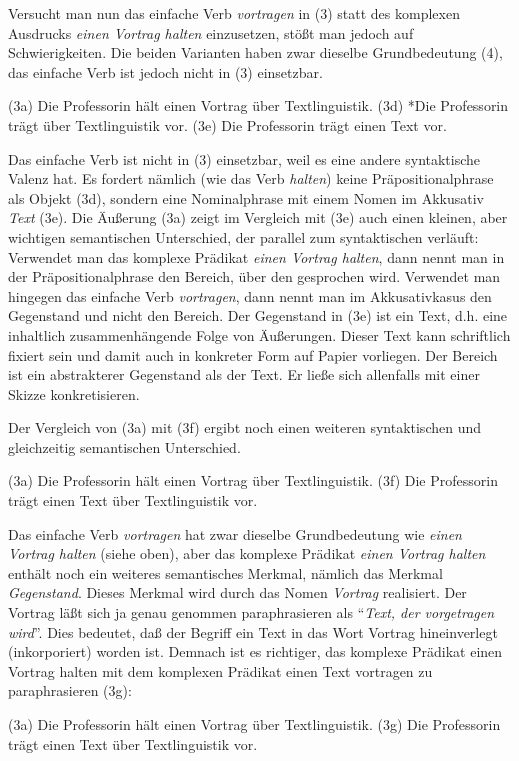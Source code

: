 \documentclass[
  letterpaper,
  DIV=11,
  numbers=noendperiod]{scrreprt}
\begin{document}
Versucht man nun das einfache Verb \emph{vortragen} in (3) statt des
komplexen Ausdrucks \emph{einen Vortrag halten} einzusetzen, stößt man
jedoch auf Schwierigkeiten. Die beiden Varianten haben zwar dieselbe
Grundbedeutung (4), das einfache Verb ist jedoch nicht in (3)
einsetzbar.

(3a) Die Professorin hält einen Vortrag über Textlinguistik. (3d) *Die
Professorin trägt über Textlinguistik vor. (3e) Die Professorin trägt
einen Text vor.

Das einfache Verb ist nicht in (3) einsetzbar, weil es eine andere
syntaktische Valenz hat. Es fordert nämlich (wie das Verb \emph{halten})
keine Präpositionalphrase als Objekt (3d), sondern eine Nominalphrase
mit einem Nomen im Akkusativ \emph{Text} (3e). Die Äußerung (3a) zeigt
im Vergleich mit (3e) auch einen kleinen, aber wichtigen semantischen
Unterschied, der parallel zum syntaktischen verläuft: Verwendet man das
komplexe Prädikat \emph{einen Vortrag halten}, dann nennt man in der
Präpositionalphrase den Bereich, über den gesprochen wird. Verwendet man
hingegen das einfache Verb \emph{vortragen}, dann nennt man im
Akkusativkasus den Gegenstand und nicht den Bereich. Der Gegenstand in
(3e) ist ein Text, d.h. eine inhaltlich zusammenhängende Folge von
Äußerungen. Dieser Text kann schriftlich fixiert sein und damit auch in
konkreter Form auf Papier vorliegen. Der Bereich ist ein abstrakterer
Gegenstand als der Text. Er ließe sich allenfalls mit einer Skizze
konkretisieren.

Der Vergleich von (3a) mit (3f) ergibt noch einen weiteren syntaktischen
und gleichzeitig semantischen Unterschied.

(3a) Die Professorin hält einen Vortrag über Textlinguistik. (3f) Die
Professorin trägt einen Text über Textlinguistik vor.

Das einfache Verb \emph{vortragen} hat zwar dieselbe Grundbedeutung wie
\emph{einen Vortrag halten} (siehe oben), aber das komplexe Prädikat
\emph{einen Vortrag halten} enthält noch ein weiteres semantisches
Merkmal, nämlich das Merkmal \emph{Gegenstand}. Dieses Merkmal wird
durch das Nomen \emph{Vortrag} realisiert. Der Vortrag läßt sich ja
genau genommen paraphrasieren als ``\emph{Text, der vorgetragen wird}''.
Dies bedeutet, daß der Begriff ein Text in das Wort Vortrag
hineinverlegt (inkorporiert) worden ist. Demnach ist es richtiger, das
komplexe Prädikat einen Vortrag halten mit dem komplexen Prädikat einen
Text vortragen zu paraphrasieren (3g):

(3a) Die Professorin hält einen Vortrag über Textlinguistik. (3g) Die
Professorin trägt einen Text über Textlinguistik vor.
\end{document}
